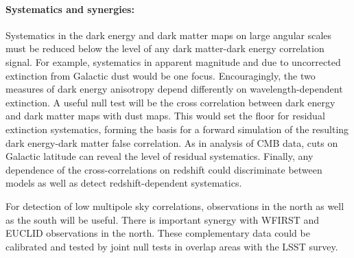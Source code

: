 \paragraph{Systematics and synergies:}
Systematics in the dark energy and dark matter maps on large angular scales must be reduced below the level of any dark matter-dark energy correlation signal.  
For example, systematics in apparent magnitude and \photoz due to uncorrected extinction from Galactic dust would be one focus. 
Encouragingly, the two measures of dark energy anisotropy depend differently on wavelength-dependent extinction. 
A useful null test will be the cross correlation between dark energy and dark matter maps with dust maps.  
This would set the floor for residual extinction systematics, forming the basis for a forward simulation of the resulting dark energy-dark matter false correlation. 
As in analysis of CMB data, cuts on Galactic latitude can reveal the level of residual systematics. 
Finally, any dependence of the cross-correlations on redshift could discriminate between models as well as detect redshift-dependent systematics.

For detection of low multipole sky correlations, observations in the north as well as the south will be useful.
There is important synergy with WFIRST and EUCLID observations in the north.  
These complementary data could be calibrated and tested by joint null tests in overlap areas with the LSST survey.
